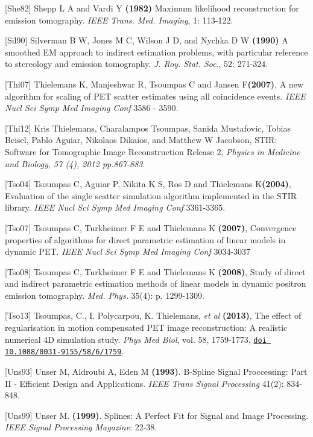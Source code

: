 \documentclass{article}
\def\url#1#2{\mbox{\href{#1}{\tt #2}}}
\begin{document}
{{{[}She82] Shepp L A and Vardi Y \textbf{(1982)} Maximum likelihood reconstruction 
for emission tomography. \textit{IEEE Trans. Med. Imaging}, 1: 113-122.


{[}Sil90] Silverman B W, Jones M C, Wilson J D, and Nychka D W \textbf{(1990)} 
A smoothed EM approach to indirect estimation problems, with 
particular reference to stereology and emission tomography. \textit{J. 
Roy. Stat. Soc}., 52: 271-324. 

{[}Thi07{]} Thielemans K, Manjeshwar R, Tsoumpas C and Jansen F\textbf{(2007)}, 
A new algorithm for scaling of PET scatter estimates using all coincidence events. 
\textit { IEEE Nucl Sci Symp Med Imaging Conf } 3586 - 3590.

{[}Thi12] Kris Thielemans, Charalampos Tsoumpas, Sanida Mustafovic, Tobias Beisel, Pablo Aguiar, Nikolaos Dikaios, and Matthew W Jacobson,
STIR: Software for Tomographic Image Reconstruction Release 2,
\textit{Physics in Medicine and Biology, 57 (4), 2012 pp.867-883}.

{[}Tso04{]} Tsoumpas C, Aguiar P, Nikita K S, Ros D and Thielemans K\textbf{(2004)}, 
Evaluation of the single scatter simulation algorithm implemented in the STIR library. 
\textit { IEEE Nucl Sci Symp Med Imaging Conf } 3361-3365.

{[}Tso07{]} Tsoumpas C, Turkheimer F E and Thielemans K  \textbf{(2007)}, 
Convergence properties of algorithms for direct parametric estimation of linear models in dynamic PET. 
\textit{IEEE Nucl Sci Symp Med Imaging Conf} 3034-3037

{[}Tso08{]} Tsoumpas C, Turkheimer F E and Thielemans K \textbf{(2008)}, Study of direct and indirect 
parametric estimation methods of linear models in dynamic positron emission tomography. \textit{Med. Phys.} 
35(4): p. 1299-1309.

[Tso13] Tsoumpas, C., I.
Polycarpou, K. Thielemans, \textit{et al} \textbf{(2013)}, The effect of
regularisation in motion compensated PET image reconstruction: A realistic
numerical 4D simulation study. \textit{Phys Med Biol}, vol. 58, 1759-1773, 
\url{http://dx.doi.org/10.1088/0031-9155/58/6/1759}{doi 10.1088/0031-9155/58/6/1759}.


{[}Uns93] Unser M, Aldroubi A, Eden M \textbf{(1993)}. B-Spline Signal Proccessing: Part II - Efficient Design and Applications.  \textit{IEEE Trans Signal Processing} 41(2): 834-848.

{[}Uns99] Unser M. \textbf{(1999)}. Splines: A Perfect Fit for Signal and Image Processing. \textit{IEEE Signal Processing Magazine}: 22-38.

}}
\end{document}

